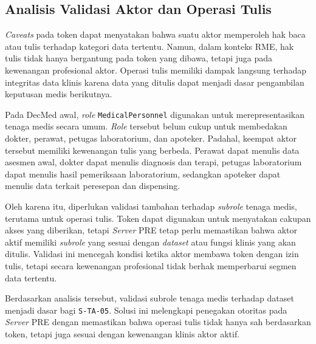 \subsection{Analisis Validasi Aktor dan Operasi Tulis}
\label{subsec:analisis-validasi-aktor-operasi-tulis}

\textit{Caveats} pada token dapat menyatakan bahwa suatu aktor memperoleh hak baca atau tulis terhadap kategori data tertentu. Namun, dalam konteks RME, hak tulis tidak hanya bergantung pada token yang dibawa, tetapi juga pada kewenangan profesional aktor. Operasi tulis memiliki dampak langsung terhadap integritas data klinis karena data yang ditulis dapat menjadi dasar pengambilan keputusan medis berikutnya.

Pada DecMed awal, \textit{role} \texttt{MedicalPersonnel} digunakan untuk merepresentasikan tenaga medis secara umum. \textit{Role} tersebut belum cukup untuk membedakan dokter, perawat, petugas laboratorium, dan apoteker. Padahal, keempat aktor tersebut memiliki kewenangan tulis yang berbeda. Perawat dapat menulis data asesmen awal, dokter dapat menulis diagnosis dan terapi, petugas laboratorium dapat menulis hasil pemeriksaan laboratorium, sedangkan apoteker dapat menulis data terkait peresepan dan dispensing.

Oleh karena itu, diperlukan validasi tambahan terhadap \textit{subrole} tenaga medis, terutama untuk operasi tulis. Token dapat digunakan untuk menyatakan cakupan akses yang diberikan, tetapi \textit{Server} PRE tetap perlu memastikan bahwa aktor aktif memiliki \textit{subrole} yang sesuai dengan \textit{dataset} atau fungsi klinis yang akan ditulis. Validasi ini mencegah kondisi ketika aktor membawa token dengan izin tulis, tetapi secara kewenangan profesional tidak berhak memperbarui segmen data tertentu.

Berdasarkan analisis tersebut, validasi subrole tenaga medis terhadap dataset menjadi dasar bagi \texttt{S-TA-05}. Solusi ini melengkapi penegakan otoritas pada \textit{Server} PRE dengan memastikan bahwa operasi tulis tidak hanya sah berdasarkan token, tetapi juga sesuai dengan kewenangan klinis aktor aktif.
